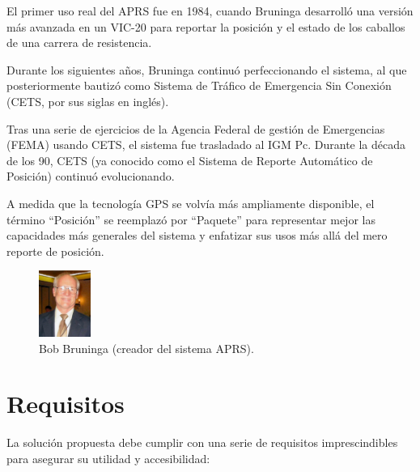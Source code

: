 El primer uso real del APRS fue en 1984, cuando Bruninga desarrolló una versión más avanzada en un VIC-20 para reportar la posición y el estado de los caballos de una carrera de resistencia.

Durante los siguientes años, Bruninga continuó perfeccionando el sistema, al que posteriormente bautizó como Sistema de Tráfico de Emergencia Sin Conexión (CETS, por sus siglas en inglés).

Tras una serie de ejercicios de la Agencia Federal de gestión de Emergencias (FEMA) usando CETS, el sistema fue trasladado al IGM Pc. Durante la década de los 90, CETS (ya conocido como el Sistema de Reporte Automático de Posición) continuó evolucionando.

A medida que la tecnología GPS se volvía más ampliamente disponible, el término ``Posición'' se reemplazó por ``Paquete'' para representar mejor las capacidades más generales del sistema y enfatizar sus usos más allá del mero reporte de posición.

\begin{figure}[h]
	\centering
	\includegraphics[width=0.15\textwidth]{Imagenes//Chapter_1/bob_bruninga.png}
	\caption{Bob Bruninga (creador del sistema APRS).}
	\label{fig:bob-bruninga}
\end{figure}

\section{Requisitos}

La solución propuesta debe cumplir con una serie de requisitos imprescindibles para asegurar su utilidad y accesibilidad:

